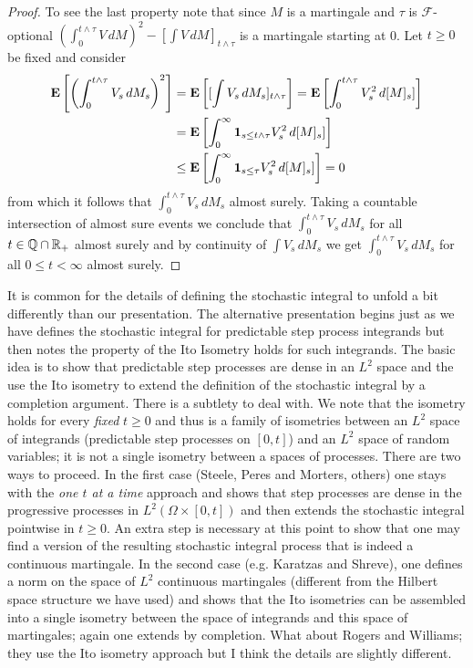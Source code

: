 \begin{proof}
To see the last property note that since $M$ is a martingale and $\tau$ is $\mathcal{F}$-optional $\left(\int_0^{t \wedge \tau}  V \, dM\right)^2 - [\int V \, dM]_{t \wedge \tau}$ is a martingale starting at 0.   Let $t \geq 0$ be fixed and consider
\begin{align*}
\textbf{E}\left[ \left( \int_0^{t \wedge \tau}  V_s \, dM_s \right)^2\right]
&=\textbf{E}\left[ [\int  V_s \, dM_s]_{t \wedge \tau} \right] = \textbf{E}\left[ \int_0^{t \wedge \tau}  V^2_s \, d[M]_s] \right] \\
&=\textbf{E}\left[ \int_0^\infty \textbf{1}_{s \leq t \wedge \tau} V^2_s \, d[M]_s] \right] \\
&\leq \textbf{E}\left[ \int_0^\infty \textbf{1}_{s \leq \tau} V^2_s \, d[M]_s] \right] = 0
\end{align*}
from which it follows that $\int_0^{t \wedge \tau}  V_s \, dM_s$ almost surely.  Taking a countable intersection of almost sure events we conclude that
$\int_0^{t \wedge \tau}  V_s \, dM_s$ for all $t \in \mathbb{Q} \cap \mathbb{R}_+$ almost surely and by continuity of $\int V_s \, dM_s$ we get $\int_0^{t \wedge \tau}  V_s \, dM_s$ 
for all $0 \leq t < \infty$ almost surely.
\end{proof}



It is common for the details of defining the stochastic integral to unfold a bit differently than our presentation.  The alternative presentation begins just as we have defines the stochastic integral for predictable step process integrands but then notes the property of the Ito Isometry holds for such integrands.  The basic idea is to show that predictable step processes are dense in an $L^2$ space and the use the Ito isometry to extend the definition of the stochastic integral by a completion argument.  There is a subtlety to deal with.  We note that the isometry holds for every \emph{fixed} $t \geq 0$ and thus is a family of isometries between an $L^2$ space of integrands (predictable step processes on $[0,t]$) and an $L^2$ space of random variables; it is not a single isometry between a spaces of processes.  There are two ways to proceed.  In the first case (Steele, Peres and Morters, others) one stays with the \emph{one $t$ at a time} approach and shows that step processes are dense in the progressive processes in $L^2(\Omega \times [0,t])$ and then extends the stochastic integral pointwise in $t \geq 0$.  An extra step is necessary at this point to show that one may find a version of the resulting stochastic integral process that is indeed a continuous martingale.  In the second case (e.g. Karatzas and Shreve), one defines a norm on the space of $L^2$ continuous martingales (different from the Hilbert space structure we have used) and shows that the Ito isometries can be assembled into a single isometry between the space of integrands and this space of martingales; again one extends by completion.  What about Rogers and Williams; they use the Ito isometry approach but I think the details are slightly different.
 
